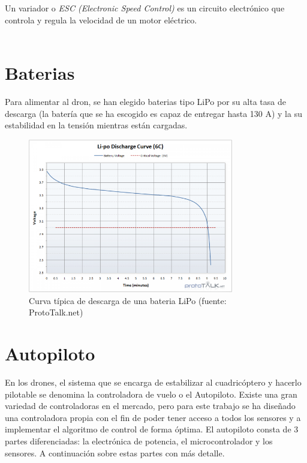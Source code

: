 Un variador o \textit{ESC (Electronic Speed Control)} es un circuito electrónico que controla y regula la velocidad de un motor eléctrico. \\


\\


\section{Baterias}
Para alimentar al dron, se han elegido baterias tipo LiPo por su alta tasa de descarga (la batería que se ha escogido es capaz de entregar hasta 130 A) y la su estabilidad en la tensión mientras están cargadas.


\begin{figure}[htb!]
		\centering
		\includegraphics[width=0.8\textwidth]{hardware/curvaLipo}
		\caption{Curva típica de descarga de una bateria LiPo (fuente: ProtoTalk.net)}
		\label{hardware:curvaLipo}

\end{figure}


\section{Autopiloto}

En los drones, el sistema que se encarga de estabilizar al cuadricóptero y hacerlo pilotable se denomina la controladora de vuelo o el Autopiloto. Existe una gran variedad de controladoras en el mercado, pero para este trabajo se ha diseñado una controladora propia con el fin de poder tener acceso a todos los sensores y a implementar el algoritmo de control de forma óptima. El autopiloto consta de 3 partes diferenciadas: la electrónica de potencia, el microcontrolador y los sensores. A continuación  sobre estas partes con más detalle.\\


